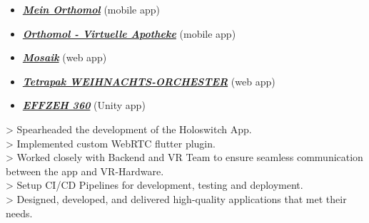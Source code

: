 \documentclass[10pt,a4paper,normalphoto]{altacv}
\begin{document}
\begin{fullwidth}
\begin{itemize}
    \item \href{https://bit.ly/3tEGnTf}{\textit{\textbf{Mein Orthomol}}} (mobile app)
    \item \href{https://bit.ly/3DfgH2S}{\textit{\textbf{Orthomol - Virtuelle Apotheke}}} (mobile app)
    \item \href{https://tetra-pak-mosaik.web.app/}{\textit{\textbf{Mosaik}}} (web app)
    \item \href{https://tetrapak-dabf7.web.app/}{\textit{\textbf{Tetrapak WEIHNACHTS-ORCHESTER}}} (web app)
    \item \href{https://bit.ly/3DcJzJ5}{\textit{\textbf{EFFZEH 360}}} (Unity app)
\end{itemize}

\vspace{1em}


\newpage


> Spearheaded the development of the Holoswitch App.\\
> Implemented custom WebRTC flutter plugin.\\
> Worked closely with Backend and VR Team to ensure seamless communication between the app and VR-Hardware.\\
> Setup CI/CD Pipelines for development, testing and deployment.\\
> Designed, developed, and delivered high-quality applications that met their needs.

\vspace{1em}


\vspace{2em}


\end{fullwidth}
\end{document}
